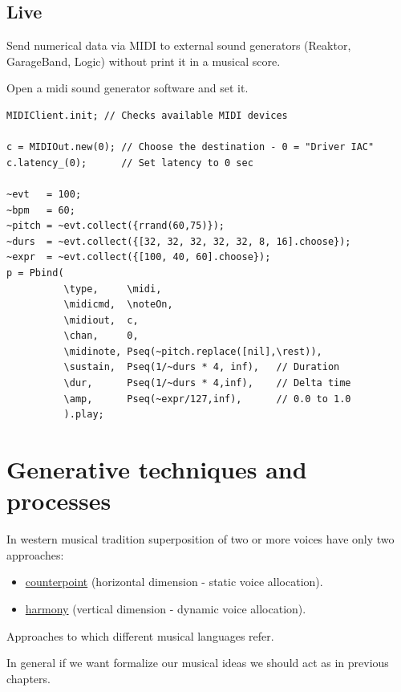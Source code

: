 \subsection{Live}\label{live}

Send numerical data via MIDI to external sound generators (Reaktor, GarageBand, Logic) without print it in a musical score.

Open a midi sound generator software and set it.

\begin{lstlisting}[frame=single, caption=Live midi out sender model] 
MIDIClient.init; // Checks available MIDI devices

c = MIDIOut.new(0); // Choose the destination - 0 = "Driver IAC"
c.latency_(0);      // Set latency to 0 sec

~evt   = 100; 
~bpm   = 60;       
~pitch = ~evt.collect({rrand(60,75)});
~durs  = ~evt.collect({[32, 32, 32, 32, 32, 8, 16].choose});
~expr  = ~evt.collect({[100, 40, 60].choose});
p = Pbind(
          \type,     \midi,
          \midicmd,  \noteOn,
          \midiout,  c,
          \chan,     0,
          \midinote, Pseq(~pitch.replace([nil],\rest)),
          \sustain,  Pseq(1/~durs * 4, inf),   // Duration
          \dur,      Pseq(1/~durs * 4,inf),    // Delta time
          \amp,      Pseq(~expr/127,inf),      // 0.0 to 1.0
          ).play;
\end{lstlisting}

\section{Generative techniques and processes}\label{generative-techniques-and-processes}

In western musical tradition superposition of two or more voices have only two approaches: 

\begin{itemize}
\tightlist
\item \href{http://www.musicaecodice.it/gitmedia/emc/5_media/palestrina1.mp4}{counterpoint} (horizontal dimension - static voice allocation).
\item \href{http://www.musicaecodice.it/gitmedia/emc/5_media/beetho1.mp4}{harmony} (vertical dimension - dynamic voice allocation).
\end{itemize}

Approaches to which different musical languages refer.

In general if we want formalize our musical ideas we should act as in previous chapters.

